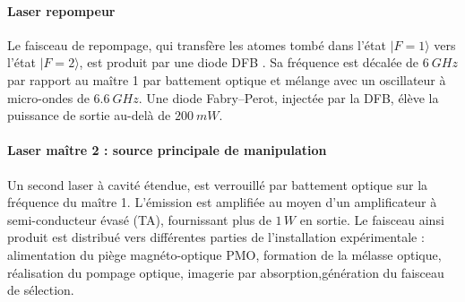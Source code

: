 \paragraph{Laser repompeur}
Le faisceau de repompage, qui transfère les atomes tombé  dans l’état $|F=1\rangle$ vers l’état $|F=2\rangle$, est produit par une diode \gls{DFB} . Sa fréquence est décalée de $6~GHz$ par rapport au maître 1 par battement optique et mélange avec un oscillateur à micro-ondes de $6.6~GHz$. Une diode Fabry–Perot, injectée par la \gls{DFB}, élève la puissance de sortie au-delà de $200~mW$.


\paragraph{Laser maître 2 : source principale de manipulation}
Un second laser à cavité étendue, est verrouillé par battement optique sur la fréquence du maître 1. L’émission est amplifiée au moyen d’un amplificateur à semi-conducteur évasé (\gls{TA}), fournissant plus de $1\,W$ en sortie. Le faisceau ainsi produit est distribué vers différentes parties de l’installation expérimentale : alimentation du piège magnéto-optique \gls{PMO}, formation de la mélasse optique, réalisation du pompage optique, imagerie par absorption,génération du faisceau de sélection.



